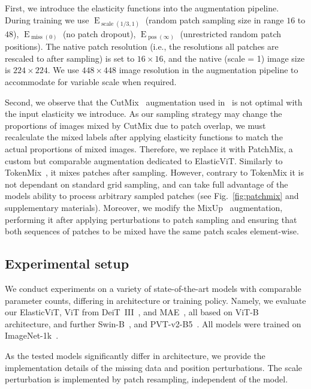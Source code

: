 \documentclass[10pt,twocolumn,letterpaper]{article}
\newcommand{\ours}[0]{ElasticViT\xspace}
\DeclareMathOperator{\E}{E}
\DeclareMathOperator{\miss}{miss}
\DeclareMathOperator{\scale}{scale}
\DeclareMathOperator{\pos}{pos}
\begin{document}
First, we introduce the elasticity functions into the augmentation pipeline. During training we use $\E_{\scale(1/3, 1)}$ (random patch sampling size in range $16$ to $48$), $\E_{\miss(0)}$ (no patch dropout), $\E_{\pos(\infty)}$ (unrestricted random patch positions). The native patch resolution (i.e., the resolutions all patches are rescaled to after sampling) is set to $16\times16$, and the native (scale = 1) image size is $224\times224$. We use $448\times448$ image resolution in the augmentation pipeline to accommodate for variable scale when required.

Second, we observe that the CutMix~\cite{yun2019cutmix} augmentation used in~\cite{touvron2022deit} is not optimal with the input elasticity we introduce. As our sampling strategy may change the proportions of images mixed by CutMix due to patch overlap, we must recalculate the mixed labels after applying elasticity functions to match the actual proportions of mixed images. Therefore, we replace it with PatchMix, a custom but comparable augmentation dedicated to ElasticViT. Similarly to TokenMix~\cite{liu2022tokenmix}, it mixes patches after sampling. However, contrary to TokenMix it is not dependant on standard grid sampling, and can take full advantage of the models ability to process arbitrary sampled patches (see Fig.~\ref{fig:patchmix} and supplementary materials). Moreover, we modify the MixUp~\cite{zhang2017mixup} augmentation, performing it after applying perturbations to patch sampling and ensuring that both sequences of patches to be mixed have the same patch scales element-wise.


\subsection{Experimental setup} \label{sec:setup}

We conduct experiments on a variety of state-of-the-art models with comparable parameter counts, differing in architecture or training policy. Namely, we evaluate our \ours, ViT from DeiT~III~\cite{touvron2022deit}, and MAE~\cite{he2022masked}, all based on ViT-B architecture, and further Swin-B~\cite{liu2021Swin}, and PVT-v2-B5~\cite{wang2021pvtv2}. All models were trained on ImageNet-1k~\cite{ILSVRC15}.

As the tested models significantly differ in architecture, we provide the implementation details of the missing data and position perturbations. The scale perturbation is implemented by patch resampling, independent of the model.
\end{document}
